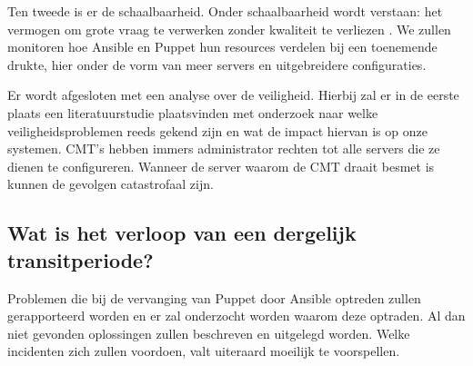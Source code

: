 Ten tweede is er de schaalbaarheid. Onder schaalbaarheid wordt verstaan: het vermogen om grote vraag te verwerken zonder kwaliteit te verliezen \autocite{informit}. We zullen monitoren hoe Ansible en Puppet hun resources verdelen bij een toenemende drukte, hier onder de vorm van meer servers en uitgebreidere configuraties. 

Er wordt afgesloten met een analyse over de veiligheid. Hierbij zal er in de eerste plaats een literatuurstudie plaatsvinden met onderzoek naar welke veiligheidsproblemen reeds gekend zijn en wat de impact hiervan is op onze systemen. CMT's hebben immers administrator rechten tot alle servers die ze dienen te configureren. Wanneer de server waarom de CMT draait besmet is kunnen de gevolgen catastrofaal zijn.

\subsection{Wat is het verloop van een dergelijk transitperiode?}

Problemen die bij de vervanging van Puppet door Ansible optreden zullen gerapporteerd worden en er zal onderzocht worden waarom deze optraden. Al dan niet gevonden oplossingen zullen beschreven en uitgelegd worden. Welke incidenten zich zullen voordoen, valt uiteraard moeilijk te voorspellen. 




